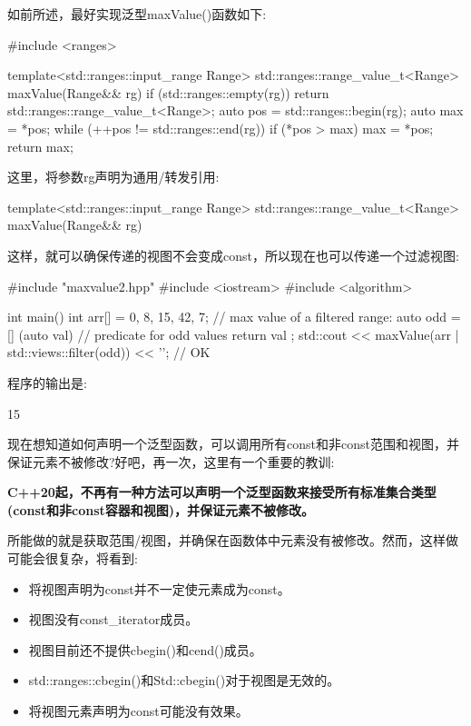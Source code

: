 如前所述，最好实现泛型maxValue()函数如下:


\begin{cpp}
#include <ranges>

template<std::ranges::input_range Range>
std::ranges::range_value_t<Range> maxValue(Range&& rg)
{
	if (std::ranges::empty(rg)) {
		return std::ranges::range_value_t<Range>{};
	}
	auto pos = std::ranges::begin(rg);
	auto max = *pos;
	while (++pos != std::ranges::end(rg)) {
		if (*pos > max) {
			max = *pos;
		}
	}
	return max;
}
\end{cpp}

这里，将参数rg声明为通用/转发引用:

\begin{cpp}
template<std::ranges::input_range Range>
std::ranges::range_value_t<Range> maxValue(Range&& rg)
\end{cpp}

这样，就可以确保传递的视图不会变成const，所以现在也可以传递一个过滤视图:


\begin{cpp}
#include "maxvalue2.hpp"
#include <iostream>
#include <algorithm>

int main()
{
	int arr[] = {0, 8, 15, 42, 7};
	// max value of a filtered range:
	auto odd = [] (auto val) { // predicate for odd values
				return val %
			};
	std::cout << maxValue(arr | std::views::filter(odd)) << '\n'; // OK
}
\end{cpp}

程序的输出是:

\begin{shell}
15
\end{shell}

现在想知道如何声明一个泛型函数，可以调用所有const和非const范围和视图，并保证元素不被修改?好吧，再一次，这里有一个重要的教训:

\textbf{C++20起，不再有一种方法可以声明一个泛型函数来接受所有标准集合类型(const和非const容器和视图)，并保证元素不被修改。}

所能做的就是获取范围/视图，并确保在函数体中元素没有被修改。然而，这样做可能会很复杂，将看到:

\begin{itemize}
\item
将视图声明为const并不一定使元素成为const。

\item
视图没有const\_iterator成员。

\item
视图目前还不提供cbegin()和cend()成员。

\item
std::ranges::cbegin()和Std::cbegin()对于视图是无效的。

\item
将视图元素声明为const可能没有效果。
\end{itemize}

